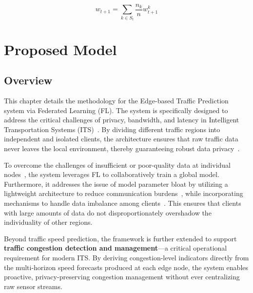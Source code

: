 \documentclass[pdflatex,sn-mathphys-num]{sn-jnl}
\theoremstyle{thmstyleone}
\theoremstyle{thmstyletwo}
\theoremstyle{thmstylethree}
\begin{document}
\begin{equation}\label{eq:8}
w_{t+1}=\sum_{k\in S_{t}}\frac{n_{k}}{n}w_{t+1}^{k}
\end{equation}


\section{Proposed Model}

\subsection{Overview}

This chapter details the methodology for the Edge-based Traffic Prediction system
via Federated Learning (FL). The system is specifically designed to address the
critical challenges of privacy, bandwidth, and latency in Intelligent Transportation
Systems (ITS)~\cite{tariq2024trustworthy,bharati2022federated}. By dividing
different traffic regions into independent and isolated clients, the architecture
ensures that raw traffic data never leaves the local environment, thereby
guaranteeing robust data privacy~\cite{gdpr2016}.

To overcome the challenges of insufficient or poor-quality data at individual
nodes~\cite{qin2025fedcontrastive}, the system leverages FL to collaboratively
train a global model. Furthermore, it addresses the issue of model parameter bloat
by utilizing a lightweight architecture to reduce communication
burdens~\cite{konecny2016federated}, while incorporating mechanisms to handle
data imbalance among clients~\cite{Zhao2018FederatedNonIID}. This ensures that
clients with large amounts of data do not disproportionately overshadow the
individuality of other regions.

Beyond traffic speed prediction, the framework is further extended to support
\textbf{traffic congestion detection and management}---a critical operational
requirement for modern ITS. By deriving congestion-level indicators directly from
the multi-horizon speed forecasts produced at each edge node, the system enables
proactive, privacy-preserving congestion management without ever centralizing
raw sensor streams.
\end{document}
